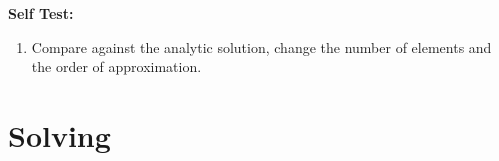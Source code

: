 \documentclass[11pt]{article}
\begin{document}
\textbf{Self Test:}
\begin{enumerate}
\item Compare against the analytic solution, change the number of elements and the order of approximation.
\end{enumerate}

\newpage
\section*{Solving}

 
\end{document}
